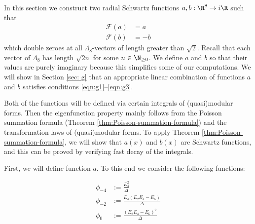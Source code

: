
In this section we construct two radial Schwartz functions $a,b:\R^8\to i\R$ such that
\begin{align}\mathcal{F}(a)&=a\label{eqn:a-fourier}\\
    \mathcal{F}(b)&=-b\label{eqn:b-fourier}
\end{align}
which double zeroes at all $\Lambda_8$-vectors of length greater than $\sqrt{2}$. Recall that each vector of $\Lambda_8$ has length $\sqrt{2n}$ for some $n\in\N_{\geq 0}$.
We define $a$ and $b$ so that their values are purely imaginary because this simplifies some of our computations.
We will show in Section \ref{sec: g} that an appropriate linear combination of functions $a$ and $b$ satisfies conditions \eqref{eqn:g1}--\eqref{eqn:g3}.

Both of the functions will be defined via certain integrals of (quasi)modular forms.
Then the eigenfunction property mainly follows from the Poisson summation formula (Theorem \ref{thm:Poisson-summation-formula}) and the transformation laws of (quasi)modular forms.
To apply Theorem \ref{thm:Poisson-summation-formula}, we will show that $a(x)$ and $b(x)$ are Schwartz functions, and this can be proved by verifying fast decay of the integrals.



First, we will define function $a$. To this end we consider the following functions:
\begin{definition}\label{def:phi4-phi2-phi0}\leanok
{}
\begin{align}
    \phi_{-4} &:= \frac{E_4^2}{\Delta} \label{eqn: def phi4} \\
    \phi_{-2} &:= \frac{E_4(E_2 E_4 - E_6)}{\Delta} \label{eqn: def phi2} \\
    \phi_{0} &:= \frac{(E_2 E_4 - E_6)^2}{\Delta} \label{eqn: def phi0}
\end{align}
\end{definition}



